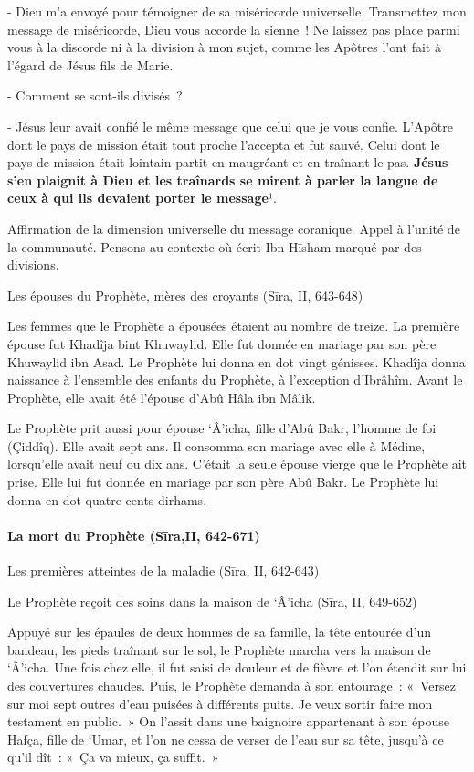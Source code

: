 {- Dieu m'a envoyé pour témoigner de sa miséricorde universelle.
Transmettez mon message de miséricorde, Dieu vous accorde la sienne~! Ne
laissez pas place parmi vous à la discorde ni à la division à mon sujet,
comme les Apôtres l'ont fait à l'égard de Jésus fils de Marie.}

{- Comment se sont-ils divisés~?}

{- Jésus leur avait confié le même message que celui que je vous
confie. L'Apôtre dont le pays de mission était tout proche l'accepta et
fut sauvé. Celui dont le pays de mission était lointain partit en
maugréant et en traînant le pas. \textbf{Jésus s'en plaignit à Dieu et
les traînards se mirent à parler la langue de ceux à qui ils devaient
porter le message}¹.}

Affirmation de la dimension universelle du message coranique. Appel à
l'unité de la communauté. Pensons au contexte où écrit Ibn Hīsham marqué
par des divisions.

Les épouses du Prophète, mères des croyants (Sīra, II, 643-648)

{Les femmes que le Prophète a épousées étaient au nombre de treize.
La première épouse fut Khadîja bint Khuwaylid. Elle fut donnée en
mariage par son père Khuwaylid ibn Asad. Le Prophète lui donna en dot
vingt génisses. Khadîja donna naissance à l'ensemble des enfants du
Prophète, à l'exception d'Ibrâhîm. Avant le Prophète, elle avait été
l'épouse d'Abû Hâla ibn Mâlik.}

{Le Prophète prit aussi pour épouse `Â'icha, fille d'Abû Bakr,
l'homme de foi (Çiddîq). Elle avait sept ans. Il consomma son mariage
avec elle à Médine, lorsqu'elle avait neuf ou dix ans. C'était la seule
épouse vierge que le Prophète ait prise. Elle lui fut donnée en mariage
par son père Abû Bakr. Le Prophète lui donna en dot quatre cents
dirhams.}


\paragraph{La mort du Prophète (Sīra,II,
642-671)}

Les premières atteintes de la maladie (Sīra, II, 642-643)

Le Prophète reçoit des soins dans la maison de `Â'icha (Sīra, II,
649-652)

{Appuyé sur les épaules de deux hommes de sa famille, la tête
entourée d'un bandeau, les pieds traînant sur le sol, le Prophète marcha
vers la maison de `Â'icha. Une fois chez elle, il fut saisi de douleur
et de fièvre et l'on étendit sur lui des couvertures chaudes. Puis, le
Prophète demanda à son entourage~: «~Versez sur moi sept outres d'eau
puisées à différents puits. Je veux sortir faire mon testament en
public.~» On l'assit dans une baignoire appartenant à son épouse Hafça,
fille de `Umar, et l'on ne cessa de verser de l'eau sur sa tête, jusqu'à
ce qu'il dît~: «~Ça va mieux, ça suffit.~»}

